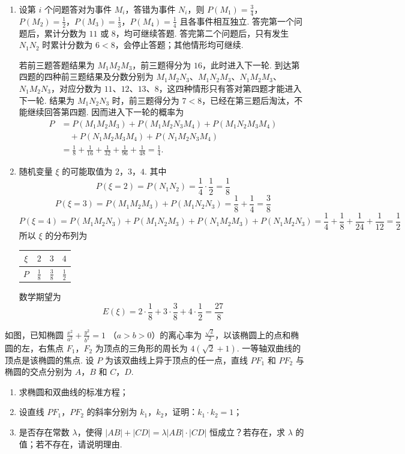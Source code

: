 \begin{solution}
\begin{enumerate}
\item 设第 \(i\) 个问题答对为事件 \(M_i\)，答错为事件 \(N_i\)，则
\(P(M_1)=\frac34\)，\(P(M_2)=\frac12\)，\(P(M_3)=\frac13\)，\(P(M_4)=\frac14\)
且各事件相互独立. 答完第一个问题后，累计分数为 \(11\) 或 \(8\)，均可继续答题. 答完第二个问题后，只有发生 \(N_1N_2\) 时累计分数为 \(6<8\)，会停止答题；其他情形均可继续.

若前三题答题结果为 \(M_1M_2M_3\)，前三题得分为 \(16\)，此时进入下一轮. 到达第四题的四种前三题结果及分数分别为 \(M_1M_2N_3\)、\(M_1N_2M_3\)、\(N_1M_2M_3\)、\(N_1M_2N_3\)，对应分数为 \(11\)、\(12\)、\(13\)、\(8\)，这四种情形只有答对第四题才能进入下一轮. 结果为 \(M_1N_2N_3\) 时，前三题得分为 \(7<8\)，已经在第三题后淘汰，不能继续回答第四题. 因而进入下一轮的概率为
\[
\begin{aligned}
P&=P(M_1M_2M_3)+P(M_1M_2N_3M_4)+P(M_1N_2M_3M_4)\\
&\quad+P(N_1M_2M_3M_4)+P(N_1M_2N_3M_4)\\
&=\frac18+\frac1{16}+\frac1{32}+\frac1{96}+\frac1{48}=\frac14.
\end{aligned}
\]
\item 随机变量 \(\xi\) 的可能取值为 \(2\)，\(3\)，\(4\). 其中
\[
P(\xi=2)=P(N_1N_2)=\frac14\cdot\frac12=\frac18
\]
\[
P(\xi=3)=P(M_1M_2M_3)+P(M_1N_2N_3)
=\frac18+\frac14=\frac38
\]
\[
P(\xi=4)=P(M_1M_2N_3)+P(M_1N_2M_3)+P(N_1M_2M_3)+P(N_1M_2N_3)
=\frac14+\frac18+\frac1{24}+\frac1{12}=\frac12
\]
所以 \(\xi\) 的分布列为
\begin{center}
\begin{tabular}{c|ccc}
\(\xi\) & \(2\) & \(3\) & \(4\) \\
\hline
\(P\) & \(\frac18\) & \(\frac38\) & \(\frac12\)
\end{tabular}
\end{center}
数学期望为
\[
E(\xi)=2\cdot\frac18+3\cdot\frac38+4\cdot\frac12=\frac{27}{8}
\]
\end{enumerate}
\end{solution}

\begin{problem}
如图，已知椭圆 \(\frac{x^2}{a^2} + \frac{y^2}{b^2} = 1\) （\(a > b > 0\)）的离心率为 \(\frac{\sqrt{2}}{2}\)，以该椭圆上的点和椭圆的左，右焦点 \(F_1\)，\(F_2\) 为顶点的三角形的周长为 \(4(\sqrt{2} + 1)\). 一等轴双曲线的顶点是该椭圆的焦点. 设 \(P\) 为该双曲线上异于顶点的任一点，直线 \(PF_1\) 和 \(PF_2\) 与椭圆的交点分别为 \(A\)，\(B\) 和 \(C\)，\(D\).
\begin{enumerate}
\item 求椭圆和双曲线的标准方程；
\item 设直线 \(PF_{1}\)，\(PF_{2}\) 的斜率分别为 \(k_{1}\)，\(k_{2}\)，证明：\(k_{1} \cdot k_{2} = 1\)；
\item 是否存在常数 \(\lambda\)，使得 \(|AB| + |CD| = \lambda |AB| \cdot |CD|\) 恒成立？若存在，求 \(\lambda\) 的值；若不存在，请说明理由.
\end{enumerate}

\end{problem}

